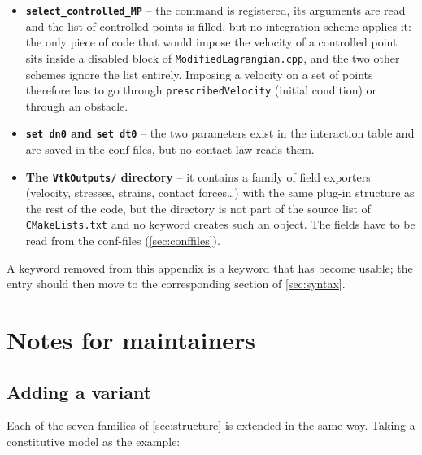 \documentclass[a4paper,onecolumn,11pt]{doofus}
\begin{document}
\begin{itemize}

\item \textbf{\texttt{select\_controlled\_MP}} -- the command is registered, its arguments are
      read and the list of controlled points is filled, but no integration scheme applies it:
      the only piece of code that would impose the velocity of a controlled point sits inside a
      disabled block of \texttt{ModifiedLagrangian.cpp}, and the two other schemes ignore the
      list entirely. Imposing a velocity on a set of points therefore has to go through
      \texttt{prescribedVelocity} (initial condition) or through an obstacle.

\item \textbf{\texttt{set dn0} and \texttt{set dt0}} -- the two parameters exist in the
      interaction table and are saved in the conf-files, but no contact law reads them.

\item \textbf{The \texttt{VtkOutputs/} directory} -- it contains a family of field exporters
      (velocity, stresses, strains, contact forces\dots) with the same plug-in structure as the
      rest of the code, but the directory is not part of the source list of
      \texttt{CMakeLists.txt} and no keyword creates such an object. The fields have to be read
      from the conf-files (\cref{sec:conffiles}).

\end{itemize}

A keyword removed from this appendix is a keyword that has become usable; the entry should then
move to the corresponding section of \cref{sec:syntax}.


\section{Notes for maintainers}
\label{sec:maintainers}

\subsection{Adding a variant}

Each of the seven families of \cref{sec:structure} is extended in the same way. Taking a
constitutive model as the example:
\end{document}

